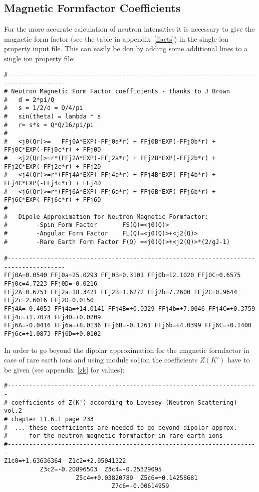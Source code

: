 \subsection{Magnetic Formfactor Coefficients}

For the more accurate calculation of neutron intensities it is
necessary to give the magnetic form factor (see the table in appendix~\ref{ffacts})
in the single ion property input file. This can
easily be don by adding some additional lines to a single ion property file:

{\footnotesize
\begin{verbatim}
#--------------------------------------------------------------------------------------
# Neutron Magnetic Form Factor coefficients - thanks to J Brown
#   d = 2*pi/Q      
#   s = 1/2/d = Q/4/pi   
#   sin(theta) = lambda * s
#   r= s*s = Q*Q/16/pi/pi
#
#   <j0(Qr)>=   FFj0A*EXP(-FFj0a*r) + FFj0B*EXP(-FFj0b*r) + FFj0C*EXP(-FFj0c*r) + FFj0D
#   <j2(Qr)>=r*(FFj2A*EXP(-FFj2a*r) + FFj2B*EXP(-FFj2b*r) + FFj2C*EXP(-FFj2c*r) + FFj2D
#   <j4(Qr)>=r*(FFj4A*EXP(-FFj4a*r) + FFj4B*EXP(-FFj4b*r) + FFj4C*EXP(-FFj4c*r) + FFj4D
#   <j6(Qr)>=r*(FFj6A*EXP(-FFj6a*r) + FFj6B*EXP(-FFj6b*r) + FFj6C*EXP(-FFj6c*r) + FFj6D
#
#   Dipole Approximation for Neutron Magnetic Formfactor:
#        -Spin Form Factor       FS(Q)=<j0(Q)>
#        -Angular Form Factor    FL(Q)=<j0(Q)>+<j2(Q)>
#        -Rare Earth Form Factor F(Q) =<j0(Q)>+<j2(Q)>*(2/gJ-1)

#--------------------------------------------------------------------------------------
FFj0A=0.0540 FFj0a=25.0293 FFj0B=0.3101 FFj0b=12.1020 FFj0C=0.6575 FFj0c=4.7223 FFj0D=-0.0216
FFj2A=0.6751 FFj2a=18.3421 FFj2B=1.6272 FFj2b=7.2600 FFj2C=0.9644 FFj2c=2.6016 FFj2D=0.0150
FFj4A=-0.4053 FFj4a=+14.0141 FFj4B=+0.0329 FFj4b=+7.0046 FFj4C=+0.3759 FFj4c=+1.7074 FFj4D=+0.0209
FFj6A=-0.0416 FFj6a=+8.0136 FFj6B=-0.1261 FFj6b=+4.0399 FFj6C=+0.1400 FFj6c=+1.0873 FFj6D=+0.0102
\end{verbatim}
}
In order to go beyond the dipolar approximation for the magnetic formfactor in case
of rare earth ions and using module {\prg so1ion} the coefficients $Z(K')$ have to
be given (see appendix~\ref{zk} for values):
{\footnotesize
\begin{verbatim}
#----------------------------------------------------------------------
# coefficients of Z(K') according to Lovesey (Neutron Scattering) vol.2
# chapter 11.6.1 page 233
#  ... these coefficients are needed to go beyond dipolar approx.
#      for the neutron magnetic formfactor in rare earth ions
#----------------------------------------------------------------------
Z1c0=+1.63636364  Z1c2=+2.95041322
		  Z3c2=-0.20896503  Z3c4=-0.25329095
				    Z5c4=+0.03820789  Z5c6=+0.14258681
						      Z7c6=-0.00614959
\end{verbatim}
}

